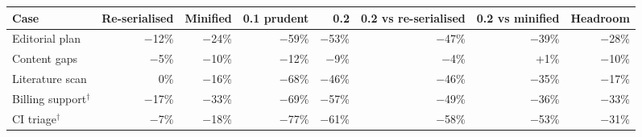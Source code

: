 \begin{tabular}{lrrrrrrr}
\toprule
Case & Re-serialised & Minified & 0.1 prudent & 0.2 & 0.2 vs re-serialised & 0.2 vs minified & Headroom \\
\midrule
Editorial plan & $-$12\% & $-$24\% & $-$59\% & $-$53\% & $-$47\% & $-$39\% & $-$28\% \\
Content gaps & $-$5\% & $-$10\% & $-$12\% & $-$9\% & $-$4\% & +1\% & $-$10\% \\
Literature scan & 0\% & $-$16\% & $-$68\% & $-$46\% & $-$46\% & $-$35\% & $-$17\% \\
Billing support$^\dagger$ & $-$17\% & $-$33\% & $-$69\% & $-$57\% & $-$49\% & $-$36\% & $-$33\% \\
CI triage$^\dagger$ & $-$7\% & $-$18\% & $-$77\% & $-$61\% & $-$58\% & $-$53\% & $-$31\% \\
\bottomrule
\end{tabular}
